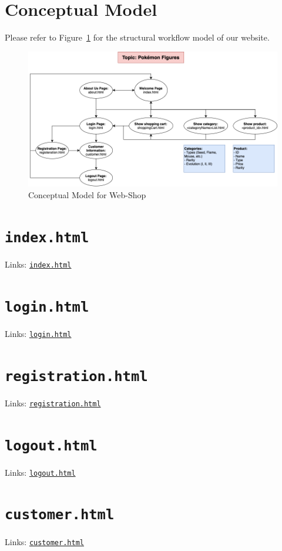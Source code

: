 \documentclass[a4paper,12pt]{article} %
\begin{document}
\section{Conceptual Model}
Please refer to  Figure~\ref{fig:task2} for the structural workflow model of our website.

\begin{figure}[h]
    \centering
    \includegraphics[width=\textwidth]{conceptual-model.drawio.png} %
    \caption{Conceptual Model for Web-Shop}
    \label{fig:task2}
\end{figure}

\section{\texttt{index.html}}
Links: 
\href{../src/index.html}{\texttt{index.html}}


\section{\texttt{login.html}}
Links: 
\href{../src/login.html}{\texttt{login.html}}


\section{\texttt{registration.html}}
Links: 
\href{../src/registration.html}{\texttt{registration.html}}


\section{\texttt{logout.html}}
Links: 
\href{../src/logout.html}{\texttt{logout.html}}


\section{\texttt{customer.html}}
Links: 
\href{../src/customer.html}{\texttt{customer.html}}
\end{document}
